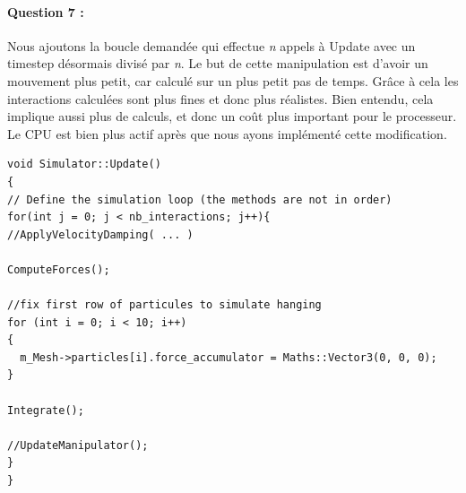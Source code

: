 \documentclass[a4paper,12pt]{article}
\begin{document}
\paragraph{Question 7 :} Nous ajoutons la boucle demandée qui effectue \textit{n} appels à \og{}Update\fg{} avec un timestep désormais divisé par \textit{n}. Le but de cette manipulation est d'avoir un mouvement plus petit, car calculé sur un plus petit pas de temps. Grâce à cela les interactions calculées sont plus fines et donc plus réalistes. Bien entendu, cela implique aussi plus de calculs, et donc un coût plus important pour le processeur. Le CPU est bien plus actif après que nous ayons implémenté cette modification. 
  \begin{lstlisting}
void Simulator::Update()
{
// Define the simulation loop (the methods are not in order)
for(int j = 0; j < nb_interactions; j++){
//ApplyVelocityDamping( ... )

ComputeForces();

//fix first row of particules to simulate hanging
for (int i = 0; i < 10; i++)
{
  m_Mesh->particles[i].force_accumulator = Maths::Vector3(0, 0, 0);
}

Integrate();

//UpdateManipulator();
}
}
  \end{lstlisting}
\end{document}
